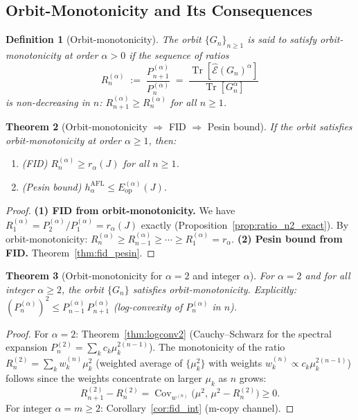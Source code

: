 \documentclass[12pt,a4paper]{article}
\newtheorem{theorem}{Theorem}[section]
\newtheorem{definition}[theorem]{Definition}
\begin{document}
\subsection{Orbit-Monotonicity and Its Consequences}
\label{sec:orbit_mono}

\begin{definition}[Orbit-monotonicity]
\label{def:orbit_mono}
The orbit $\{G_n\}_{n\geq 1}$ is said to satisfy \emph{orbit-monotonicity}
at order $\alpha>0$ if the sequence of ratios
\[
  R_n^{(\alpha)} \;:=\; \frac{P_{n+1}^{(\alpha)}}{P_n^{(\alpha)}}
  \;=\; \frac{\operatorname{Tr}[\hat{\mathcal{E}}(G_n)^\alpha]}
             {\operatorname{Tr}[G_n^\alpha]}
\]
is non-decreasing in $n$: $R_{n+1}^{(\alpha)}\geq R_n^{(\alpha)}$ for all $n\geq 1$.
\end{definition}

\begin{theorem}[Orbit-monotonicity $\Rightarrow$ FID $\Rightarrow$ Pesin bound]
\label{thm:om_fid}
If the orbit satisfies orbit-monotonicity at order $\alpha\geq 1$, then:
\begin{enumerate}
\item (FID) $R_n^{(\alpha)}\geq r_\alpha(J)$ for all $n\geq 1$.
\item (Pesin bound) $h_\alpha^{\mathrm{AFL}}\leq E_{\mathrm{op}}^{(\alpha)}(J)$.
\end{enumerate}
\end{theorem}

\begin{proof}
\textbf{(1) FID from orbit-monotonicity.}
We have $R_1^{(\alpha)}=P_2^{(\alpha)}/P_1^{(\alpha)}=r_\alpha(J)$ exactly
(Proposition~\ref{prop:ratio_n2_exact}).  By orbit-monotonicity:
$R_n^{(\alpha)}\geq R_{n-1}^{(\alpha)}\geq\cdots\geq R_1^{(\alpha)}=r_\alpha$.
\textbf{(2) Pesin bound from FID.}
Theorem~\ref{thm:fid_pesin}.
\end{proof}

\begin{theorem}[Orbit-monotonicity for $\alpha=2$ and integer $\alpha$]
\label{thm:om_alpha2}
For $\alpha=2$ and for all integer $\alpha\geq 2$, the orbit $\{G_n\}$
satisfies orbit-monotonicity.  Explicitly:
$(P_n^{(\alpha)})^2\leq P_{n-1}^{(\alpha)}\,P_{n+1}^{(\alpha)}$
(log-convexity of $P_n^{(\alpha)}$ in $n$).
\end{theorem}

\begin{proof}
For $\alpha=2$: Theorem~\ref{thm:logconv2} (Cauchy–Schwarz for the spectral expansion
$P_n^{(2)}=\sum_k c_k\mu_k^{2(n-1)}$).
The monotonicity of the ratio $R_n^{(2)}=\sum_k w_k^{(n)}\mu_k^2$
(weighted average of $\{\mu_k^2\}$ with weights $w_k^{(n)}\propto c_k\mu_k^{2(n-1)}$)
follows since the weights concentrate on larger $\mu_k$ as $n$ grows:
\[
  R_{n+1}^{(2)}-R_n^{(2)}
  = \operatorname{Cov}_{w^{(n)}}\!\bigl(\mu^2,\,\mu^2 - R_n^{(2)}\bigr)\geq 0.
\]
For integer $\alpha=m\geq 2$: Corollary~\ref{cor:fid_int} (m-copy channel).
\end{proof}
\end{document}

